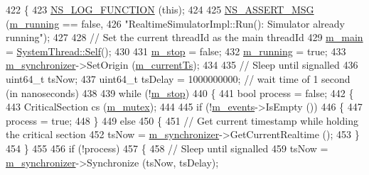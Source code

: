 \begin{DoxyCode}
422 \{
423   \hyperlink{log-macros-disabled_8h_a90b90d5bad1f39cb1b64923ea94c0761}{NS\_LOG\_FUNCTION} (\textcolor{keyword}{this});
424 
425   \hyperlink{assert_8h_aff5ece9066c74e681e74999856f08539}{NS\_ASSERT\_MSG} (\hyperlink{classns3_1_1RealtimeSimulatorImpl_a4907d7e58b7221984a86d5f63439ea8d}{m\_running} == \textcolor{keyword}{false}, 
426                  \textcolor{stringliteral}{"RealtimeSimulatorImpl::Run(): Simulator already running"});
427 
428   \textcolor{comment}{// Set the current threadId as the main threadId}
429   \hyperlink{classns3_1_1RealtimeSimulatorImpl_aaa303327c2bd048980223e4f4fea1be6}{m\_main} = \hyperlink{classns3_1_1SystemThread_a76dffd0c4383357194c9604f073b0d79}{SystemThread::Self}();
430 
431   \hyperlink{classns3_1_1RealtimeSimulatorImpl_a8393aba34f9e1c9ab56475c2165547c9}{m\_stop} = \textcolor{keyword}{false};
432   \hyperlink{classns3_1_1RealtimeSimulatorImpl_a4907d7e58b7221984a86d5f63439ea8d}{m\_running} = \textcolor{keyword}{true};
433   \hyperlink{classns3_1_1RealtimeSimulatorImpl_a87a72268b521afcae7ea4c891c398d27}{m\_synchronizer}->SetOrigin (\hyperlink{classns3_1_1RealtimeSimulatorImpl_a613ff41dee1e66129c4d5cc81c00cf60}{m\_currentTs});
434 
435   \textcolor{comment}{// Sleep until signalled}
436   uint64\_t tsNow;
437   uint64\_t tsDelay = 1000000000; \textcolor{comment}{// wait time of 1 second (in nanoseconds)}
438  
439   \textcolor{keywordflow}{while} (!\hyperlink{classns3_1_1RealtimeSimulatorImpl_a8393aba34f9e1c9ab56475c2165547c9}{m\_stop}) 
440     \{
441       \textcolor{keywordtype}{bool} process = \textcolor{keyword}{false};
442       \{
443         CriticalSection cs (\hyperlink{classns3_1_1RealtimeSimulatorImpl_a02be368e7cbd8a6f9d62db36c3fd373b}{m\_mutex});
444 
445         \textcolor{keywordflow}{if} (!\hyperlink{classns3_1_1RealtimeSimulatorImpl_a0cccd690eafca8285f5cc4d3909a9593}{m\_events}->IsEmpty ())
446           \{
447             process = \textcolor{keyword}{true};
448           \}
449         \textcolor{keywordflow}{else}
450           \{
451             \textcolor{comment}{// Get current timestamp while holding the critical section}
452             tsNow = \hyperlink{classns3_1_1RealtimeSimulatorImpl_a87a72268b521afcae7ea4c891c398d27}{m\_synchronizer}->GetCurrentRealtime ();
453           \}
454       \}
455  
456       \textcolor{keywordflow}{if} (!process)
457         \{
458           \textcolor{comment}{// Sleep until signalled}
459           tsNow = \hyperlink{classns3_1_1RealtimeSimulatorImpl_a87a72268b521afcae7ea4c891c398d27}{m\_synchronizer}->Synchronize (tsNow, tsDelay);

\end{DoxyCode}

